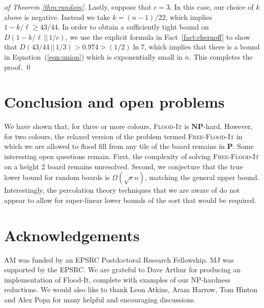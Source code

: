 \documentclass[a4paper,11pt]{llncs}
\newcounter{l}
\renewcommand{\geq}{\geqslant}
\newcommand{\Ptime}{\ensuremath{\mathbf{P}}}
\newcommand{\NPtime}{\ensuremath{\mathbf{NP}}}
\newcommand{\ColoroidF}{\textsc{Free-Flood-It}}
\newcommand{\Floodit}{\textsc{Flood-It}}
\begin{document}
\begin{proof}[of Theorem \ref{thm:random}]
    Lastly, suppose that $c=3$. In this case, our choice of $k$ above is negative. Instead we take $k=(n-1)/22$, which implies $1-k/\ell\geq 43/44$. In order to obtain a sufficiently tight bound on $D(1-k/\ell\,||\,1/c)$, we use the explicit formula in Fact~\ref{fact:chernoff} to show that $D(43/44\,||\,1/3) > 0.974 > (1/2)\ln 7$, which implies that there is a bound in Equation~(\ref{eqn:union}) which is exponentially small in $n$. This completes the proof.
    \qed
\end{proof}


\section{Conclusion and open problems} \label{sec:conc}
We have shown that, for three or more colours, \Floodit{} is \NPtime-hard. However, for two colours, the relaxed version of the problem termed \ColoroidF{} in which we are allowed to flood fill from any tile of the board remains in \Ptime. Some interesting open questions remain. First, the complexity of solving \ColoroidF{} on a height 2 board remains unresolved. Second, we conjecture that the true lower bound for random boards is $\Omega(\sqrt{c}n)$, matching the general upper bound. Interestingly, the percolation theory techniques that we are aware of do not appear to allow for super-linear lower bounds of the sort that would be required.

\section{Acknowledgements}
AM was funded by an EPSRC Postdoctoral Research Fellowship. MJ was supported by the EPSRC. We are grateful to Dave Arthur for producing an implementation of Flood-It, complete with examples of our NP-hardness reductions.  We
would also like to thank Leon Atkins, Aram Harrow, Tom Hinton and Alex Popa for many helpful and encouraging discussions.




\end{document}
